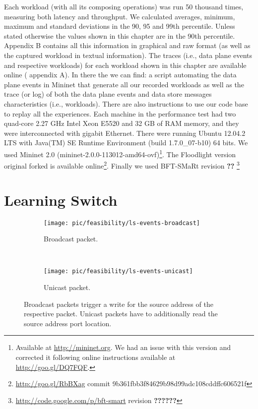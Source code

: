 Each workload (with all its composing operations)  was run 50 thousand times, measuring both latency and throughput. 
We calculated averages, minimum, maximum and standard deviations in the 90, 95 and 99th percentile. 
Unless stated otherwise the values shown in this chapter are in the 90th percentile. Appendix B \cite{support}  contains all this information in graphical and raw format (as well as the captured workload in textual information). The traces (i.e., data plane events and respective workloads) for each workload shown in this chapter are available online (\cite{support} appendix A). 
In there the we can find: a script automating the data plane events in Mininet that generate all our recorded workloads as well as the trace (or log)  of both the data plane events and data store messages characteristics (i.e.,  workloads). 
There are also instructions to use our code base to replay all the experiences. 
Each machine in the performance test had two quad-core 2.27 GHz Intel Xeon E5520 and 32 GB of RAM memory, and they were interconnected with gigabit Ethernet. 
There were running  Ubuntu 12.04.2 LTS with  Java(TM) SE Runtime Environment (build 1.7.0\_07-b10) 64 bits.
 We used Mininet 2.0 (mininet-2.0.0-113012-amd64-ovf)\footnote{Available at \url{http://mininet.org}. We had an issue with this version and corrected it following online instructions available at \url{http://goo.gl/DQ7FQF}.}. 
The Floodlight version original forked  is available online\footnote{\url{http://goo.gl/RbBXag} commit 9b361fbb3f84629b98d99adc108cddffc606521f}. Finally we used BFT-SMaRt revision \textbf{??} \footnote{\url{http://code.google.com/p/bft-smart} revision \textbf{??????}} 


\section{Learning Switch} 
\label{sec:feasibility:ls}
\glsresetall

\begin{figure}[ht]

  \begin{subfigure}[b]{0.5\textwidth}
                \centering
                \texttt{[image: pic/feasibility/ls-events-broadcast]}
                \caption{Broadcast packet.}
                \label{fig:ls:interaction:broadcast}
        \end{subfigure}%
        ~
        \begin{subfigure}[b]{0.5\textwidth}
                \centering
                \texttt{[image: pic/feasibility/ls-events-unicast]}
                \caption{Unicast packet.}
                \label{fig:ls:interaction:unicast}
        \end{subfigure}
        \caption[Learning Switch workloads]{Broadcast packets trigger a write for the source address of the respective packet. Unicast packets have to additionally read the source address port location.}
        \label{fig:ls:interaction}
\end{figure}

